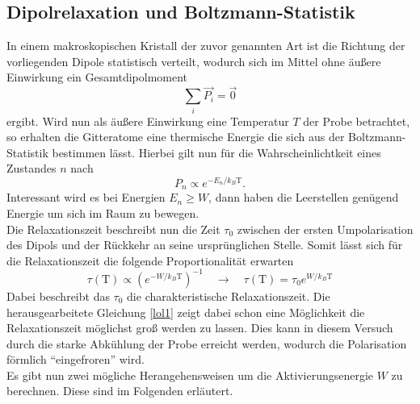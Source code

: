 \subsection{Dipolrelaxation und Boltzmann-Statistik}
In einem makroskopischen Kristall der zuvor genannten Art ist die Richtung der vorliegenden Dipole statistisch verteilt, wodurch sich im Mittel ohne äußere Einwirkung ein Gesamtdipolmoment
\begin{equation*}
\sum_{i} \vec{P_{i}} = \vec{0}
\end{equation*}
ergibt. Wird nun als äußere Einwirkung eine Temperatur $T$ der Probe betrachtet, so erhalten die Gitteratome eine thermische Energie die sich aus der Boltzmann-Statistik bestimmen lässt.
Hierbei gilt nun für die Wahrscheinlichtkeit eines Zustandes $n$ nach \cite{Briels2016}
\begin{equation*}
P_n \propto e^{- E_n / k_{B}\text{T}}.
\end{equation*}
Interessant wird es bei Energien $E_n \geq W$, dann haben die Leerstellen genügend Energie um sich im Raum zu bewegen.
\\
Die Relaxationszeit beschreibt nun die Zeit $\tau_0$ zwischen der ersten Umpolarisation des Dipols und der Rückkehr an seine ursprünglichen Stelle.
Somit lässt sich für die Relaxationszeit die folgende Proportionalität erwarten
\begin{equation}
    \label{eqn:lol1}
\tau(\text{T}) \propto  \left( e^{- W / k_{B}\text{T}}\right)^{-1} \quad \to \quad \tau(\text{T}) = \tau_0  e^{ W / k_{B}\text{T}}
\end{equation}
Dabei beschreibt das $\tau_0$ die charakteristische Relaxationszeit.
Die herausgearbeitete Gleichung \eqref{lol1} zeigt dabei schon eine Möglichkeit die Relaxationszeit möglichst groß werden zu lassen. Dies kann in diesem Versuch durch die starke Abkühlung der Probe
erreicht werden, wodurch die Polarisation förmlich \enquote{eingefroren} wird.
\\
Es gibt nun zwei mögliche Herangehensweisen um die Aktivierungsenergie $W$ zu berechnen. Diese sind im Folgenden erläutert.

